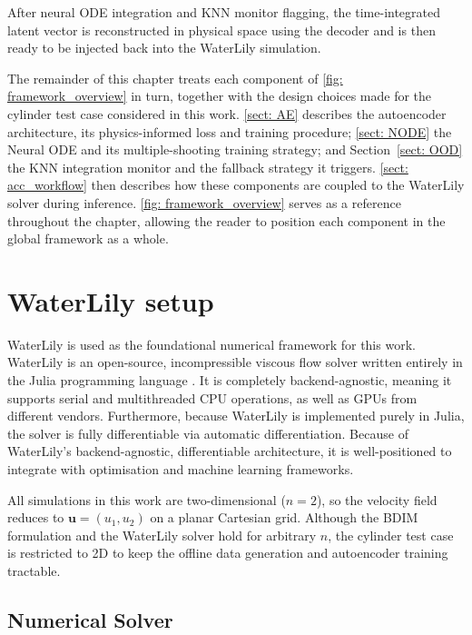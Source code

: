 After neural ODE integration and KNN monitor flagging, the time-integrated latent vector is reconstructed in physical space using the decoder and is then ready to be injected back into the WaterLily simulation. 

The remainder of this chapter treats each component of \autoref{fig: framework_overview} in turn, together with the design choices made for the cylinder test case considered in this work. \autoref{sect: AE} describes the autoencoder architecture, its physics-informed loss and training procedure; \autoref{sect: NODE} the Neural ODE and its multiple-shooting training strategy; and Section~\ref{sect: OOD} the KNN integration monitor and the fallback strategy it triggers. \autoref{sect: acc_workflow} then describes how these components are coupled to the WaterLily solver during inference. \autoref{fig: framework_overview} serves as a reference throughout the chapter, allowing the reader to position each component in the global framework as a whole. 

\section{WaterLily setup}

WaterLily is used as the foundational numerical framework for this work. WaterLily is an open-source, incompressible viscous flow solver written entirely in the Julia programming language \textcite{Weymouth2025}. It is completely backend-agnostic, meaning it supports serial and multithreaded CPU operations, as well as GPUs from different vendors. Furthermore, because WaterLily is implemented purely in Julia, the solver is fully differentiable via automatic differentiation. Because of WaterLily's backend-agnostic, differentiable architecture, it is well-positioned to integrate with optimisation and machine learning frameworks.

All simulations in this work are two-dimensional ($n = 2$), so the velocity field reduces to $\mathbf{u} = (u_1, u_2)$ on a planar Cartesian grid. Although the BDIM formulation and the WaterLily solver hold for arbitrary $n$, the cylinder test case is restricted to 2D to keep the offline data generation and autoencoder training tractable.

\subsection{Numerical Solver}

